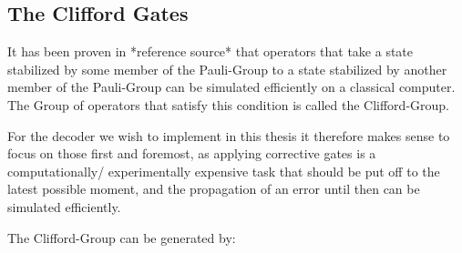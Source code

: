 \subsection{The Clifford Gates}

It has been proven in *reference source* that operators that 
take a state stabilized by some member of the Pauli-Group to 
a state stabilized by another member of the Pauli-Group can be simulated efficiently
on a classical computer. The Group of operators that satisfy
this condition is called the Clifford-Group.

For the decoder we wish to implement in
this thesis it therefore makes sense to focus on those first and
foremost, as applying corrective gates is a computationally/
experimentally expensive task that should be put off to the latest
possible moment, and the propagation of an error until then can be
simulated efficiently. 

The Clifford-Group can be generated by:

